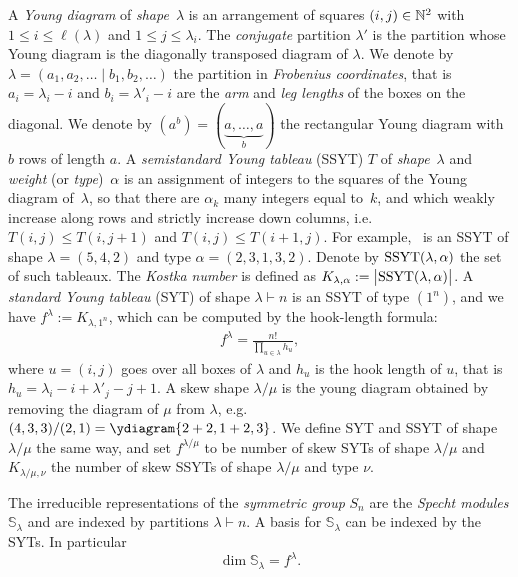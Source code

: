 \documentclass[11pt]{amsart}
\newcommand{\darkblue}{\color{darkblue}}
\newcommand{\defn}[1]{\emph{\darkblue #1}}
\theoremstyle{plain}
\theoremstyle{definition}
\numberwithin{equation}{section}
\newcommand{\la}{\lambda}
\newcommand{\nn}{\Bbb N}
\newcommand{\al}{\alpha}
\def\SSYT{ {\text {\rm SSYT}  } }
\def\la{\lambda}
\begin{document}

A \defn{Young diagram} of
\emph{shape}~$\la$ is an arrangement of squares
$(i,j)\in \nn^2$ with $1\le i\le \ell(\la)$
and $1\le j\le \la_i$. The \defn{conjugate} partition $\la'$ is the partition whose Young diagram is the diagonally transposed diagram of $\la$. We denote by $\la=(a_1,a_2,\ldots \mid b_1,b_2,\ldots)$ the partition in \defn{Frobenius coordinates}, that is $a_i = \la_i-i$ and $b_i = \la'_i-i$ are the \defn{arm} and \defn{leg lengths} of the boxes on the diagonal. We denote by $(a^b) = (\underbrace{a,\ldots,a}_b)$ the rectangular Young diagram with $b$ rows of length $a$. 
A \defn{semistandard Young tableau} (SSYT) $T$ of
\emph{shape}~$\la$ and \emph{weight} (or \emph{type})~$\al$ is an
assignment of integers to the squares of the Young diagram of~$\lambda$, so that there are $\al_k$ many integers equal to~$k$, and which weakly increase along rows and strictly
increase down columns, i.e. $T(i,j) \leq T(i,j+1)$ and $T(i,j) \leq T(i+1,j)$. For example, 
\  is an SSYT of shape $\la=(5,4,2)$ and type $\al=(2,3,1,3,2)$.
Denote by $\SSYT(\la,\al)$ the
set of such tableaux. The \defn{Kostka number} is defined as
$K_{\la,\al} := \bigl|\SSYT(\la,\al)\bigr|$. A \defn{standard Young tableau} (SYT) of shape $\la\vdash n$ is an SSYT of type $(1^n)$, and we have $f^\la := K_{\la,1^n}$, which can be computed by the hook-length formula:
\begin{align}\label{eq:HLF}
f^\la = \frac{ n!}{\prod_{u \in \la } h_u}, \tag{HLF}
\end{align} 
where $u=(i,j)$ goes over all boxes of $\la$ and $h_u$ is the hook length of $u$, that is $h_u=\la_i-i+\la'_j-j+1$. A skew shape $\la/\mu$ is the young diagram obtained by removing the diagram of $\mu$ from $\la$, e.g. $(4,3,3)/(2,1)= \ydiagram{2+2,1+2,3}$. We define SYT and SSYT of shape $\la/\mu$ the same way, and set $f^{\la/\mu}$ to be number of skew SYTs of shape $\la/\mu$ and $K_{\la/\mu,\nu}$ the number of skew SSYTs of shape $\la/\mu$ and type $\nu$.


The irreducible representations of the \defn{symmetric group} $S_n$ are the \defn{Specht modules} $\mathbb{S}_\la$ and are indexed by partitions $\la \vdash n$. A basis for $\mathbb{S}_\la$ can be indexed by the SYTs. In particular
$$\dim \mathbb{S}_\la = f^\la.$$
\end{document}
